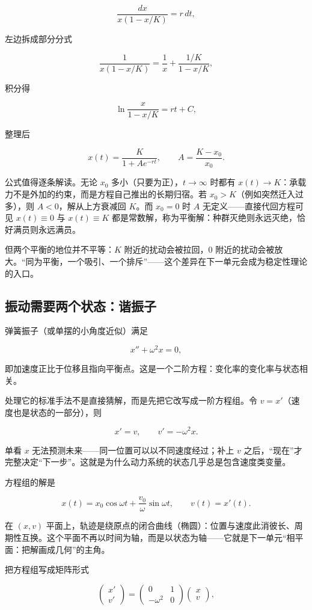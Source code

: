 \[
\frac{dx}{x(1-x/K)}=r\,dt,
\]

左边拆成部分分式

\[
\frac{1}{x(1-x/K)}=\frac1x+\frac{1/K}{1-x/K},
\]

积分得

\[
\ln\frac{x}{1-x/K}=rt+C,
\]

整理后

\[
x(t)=\frac{K}{1+Ae^{-rt}},
\qquad
A=\frac{K-x_0}{x_0}.
\]

公式值得逐条解读。无论 \(x_0\) 多小（只要为正），\(t\to\infty\) 时都有 \(x(t)\to K\)：承载力不是外加的约束，而是方程自己推出的长期归宿。若 \(x_0>K\)（例如突然迁入过多），则 \(A<0\)，解从上方衰减回 \(K\)。而 \(x_0=0\) 时 \(A\) 无定义——直接代回方程可见 \(x(t)\equiv0\) 与 \(x(t)\equiv K\) 都是常数解，称为平衡解：种群灭绝则永远灭绝，恰好满员则永远满员。

但两个平衡的地位并不平等：\(K\) 附近的扰动会被拉回，\(0\) 附近的扰动会被放大。``同为平衡，一个吸引、一个排斥''——这个差异在下一单元会成为稳定性理论的入口。

\subsection{振动需要两个状态：谐振子}

弹簧振子（或单摆的小角度近似）满足

\[
x''+\omega^2x=0,
\]

即加速度正比于位移且指向平衡点。这是一个二阶方程：变化率的变化率与状态相关。

处理它的标准手法不是直接猜解，而是先把它改写成一阶方程组。令 \(v=x'\)（速度也是状态的一部分），则

\[
x'=v,
\qquad
v'=-\omega^2x.
\]

单看 \(x\) 无法预测未来——同一位置可以以不同速度经过；补上 \(v\) 之后，``现在''才完整决定``下一步''。这就是为什么动力系统的状态几乎总是包含速度类变量。

方程组的解是

\[
x(t)=x_0\cos\omega t+\frac{v_0}{\omega}\sin\omega t,
\qquad
v(t)=x'(t).
\]

在 \((x,v)\) 平面上，轨迹是绕原点的闭合曲线（椭圆）：位置与速度此消彼长、周期性互换。这个平面不再以时间为轴，而是以状态为轴——它就是下一单元``相平面：把解画成几何''的主角。

把方程组写成矩阵形式

\[
\begin{pmatrix}x'\\v'\end{pmatrix}
=
\begin{pmatrix}0&1\\-\omega^2&0\end{pmatrix}
\begin{pmatrix}x\\v\end{pmatrix},
\]

